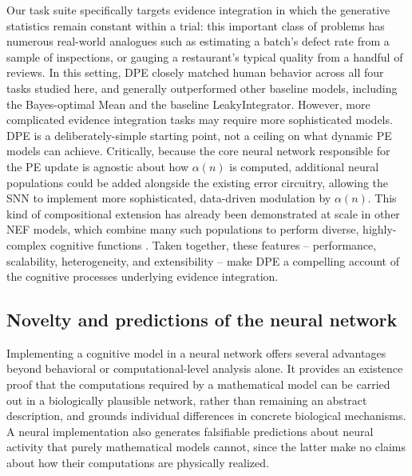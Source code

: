 \documentclass[12pt]{article}
\begin{document}
Our task suite specifically targets evidence integration in which the generative statistics remain constant within a trial: this important class of problems has numerous real-world analogues such as estimating a batch's defect rate from a sample of inspections, or gauging a restaurant's typical quality from a handful of reviews. In this setting, DPE closely matched human behavior across all four tasks studied here, and generally outperformed other baseline models, including the Bayes-optimal Mean and the baseline LeakyIntegrator. However, more complicated evidence integration tasks may require more sophisticated models. DPE is a deliberately-simple starting point, not a ceiling on what dynamic PE models can achieve. Critically, because the core neural network responsible for the PE update is agnostic about how $\alpha(n)$ is computed, additional neural populations could be added alongside the existing error circuitry, allowing the SNN to implement more sophisticated, data-driven modulation by $\alpha(n)$. This kind of compositional extension has already been demonstrated at scale in other NEF models, which combine many such populations to perform diverse, highly-complex cognitive functions \cite{choo2018spaun, dumont2023biologically}. Taken together, these features -- performance, scalability, heterogeneity, and extensibility -- make DPE a compelling account of the cognitive processes underlying evidence integration.

\subsection{Novelty and predictions of the neural network}
Implementing a cognitive model in a neural network offers several advantages beyond behavioral or computational-level analysis alone. It provides an existence proof that the computations required by a mathematical model can be carried out in a biologically plausible network, rather than remaining an abstract description, and grounds individual differences in concrete biological mechanisms. A neural implementation also generates falsifiable predictions about neural activity that purely mathematical models cannot, since the latter make no claims about how their computations are physically realized.
\end{document}
